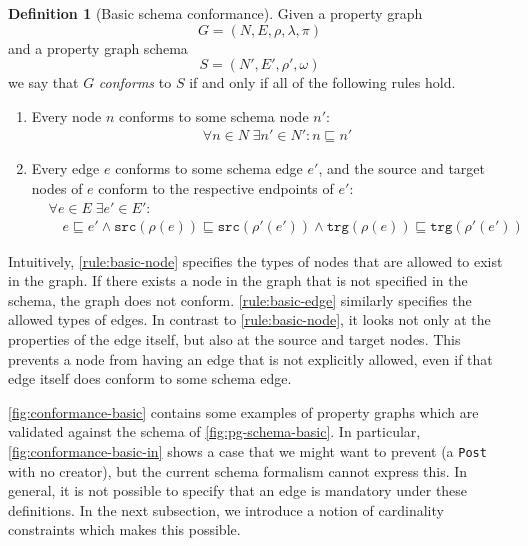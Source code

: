 \documentclass{report}
\theoremstyle{definition}
\newtheorem{definition}{Definition}
\newcommand{\src}{\mathtt{src}}
\newcommand{\trg}{\mathtt{trg}}
\newcommand{\conf}{\sqsubseteq}
\begin{document}
\begin{definition}[Basic schema conformance]
  \label{def:schema-conformance-basic}
  Given a property graph $$G = (N, E, \rho, \lambda, \pi)$$ and a property graph schema $$S = (N', E', \rho', \omega)$$ we say that $G$ \emph{conforms} to $S$ if and only if all of the following rules hold.

  \begin{enumerate}
    \item\label{rule:basic-node}
    Every node $n$ conforms to some schema node $n'$:
    \begin{align*}
       & \forall n \in N \; \exists n' \in N' : n \conf n'
    \end{align*}

    \item\label{rule:basic-edge}
    Every edge $e$ conforms to some schema edge $e'$, and the source and target nodes of $e$ conform to the respective endpoints of $e'$:
    \begin{align*}
       & \forall e \in E \; \exists e' \in E' :                      \\
       & \quad e \conf e' \wedge \src(\rho(e)) \conf \src(\rho'(e'))
      \wedge \trg(\rho(e)) \conf \trg(\rho'(e'))
    \end{align*}
  \end{enumerate}
\end{definition}

Intuitively, \autoref{rule:basic-node} specifies the types of nodes that are allowed to exist in the graph. If there exists a node in the graph that is not specified in the schema, the graph does not conform. \autoref{rule:basic-edge} similarly specifies the allowed types of edges. In contrast to \autoref{rule:basic-node}, it looks not only at the properties of the edge itself, but also at the source and target nodes. This prevents a node from having an edge that is not explicitly allowed, even if that edge itself does conform to some schema edge.

\autoref{fig:conformance-basic} contains some examples of property graphs which are validated against the schema of \autoref{fig:pg-schema-basic}. In particular, \autoref{fig:conformance-basic-in} shows a case that we might want to prevent (a \texttt{Post} with no creator), but the current schema formalism cannot express this. In general, it is not possible to specify that an edge is mandatory under these definitions. In the next subsection, we introduce a notion of cardinality constraints which makes this possible.
\end{document}
